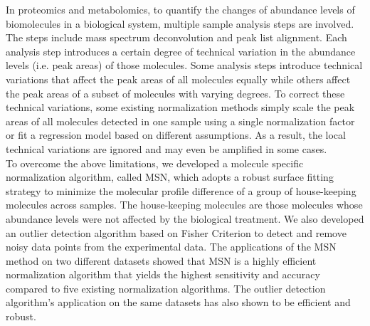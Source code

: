 \begin{thesisabstract}
In proteomics and metabolomics, to quantify the changes of abundance levels of biomolecules in a biological system, multiple sample analysis steps are involved. The steps include mass spectrum deconvolution and peak list alignment. Each analysis step introduces a certain degree of technical variation in the abundance levels (i.e. peak areas) of those molecules. Some analysis steps introduce technical variations that affect the peak areas of all molecules equally while others affect the peak areas of a subset of molecules with varying degrees. To correct these technical variations, some existing normalization methods simply scale the peak areas of all molecules detected in one sample using a single normalization factor or fit a regression model based on different assumptions. As a result, the local technical variations are ignored and may even be amplified in some cases.\\
\indent To overcome the above limitations, we developed a molecule specific normalization algorithm, called MSN, which adopts a robust surface fitting strategy to minimize the molecular profile difference of a group of house-keeping molecules across samples. The house-keeping molecules are those molecules whose abundance levels were not affected by the biological treatment. We also developed an outlier detection algorithm based on Fisher Criterion to detect and remove noisy data points from the experimental data. The applications of the MSN method on two different datasets showed that MSN is a highly efficient normalization algorithm that yields the highest sensitivity and accuracy compared to five existing normalization algorithms. The outlier detection algorithm's application on the same datasets has also shown to be efficient and robust.
\end{thesisabstract}